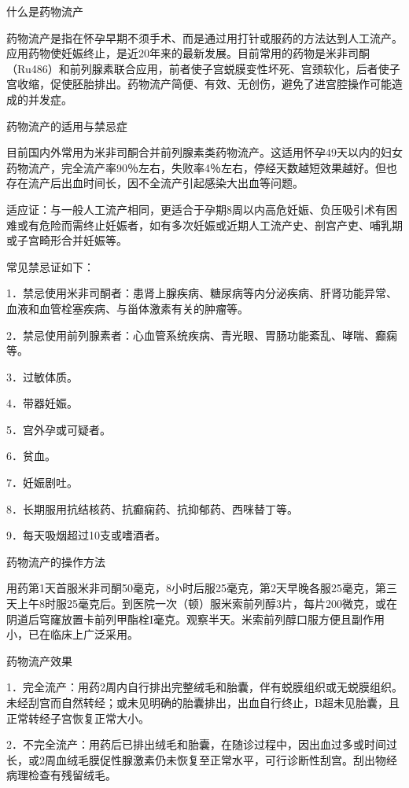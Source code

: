 \documentclass[12pt,UTF8,openany]{ctexbook}
\begin{document}
什么是药物流产


药物流产是指在怀孕早期不须手术、而是通过用打针或服药的方法达到人工流产。应用药物使妊娠终止，是近20年来的最新发展。目前常用的药物是米非司酮（Ru486）和前列腺素联合应用，前者使子宫蜕膜变性坏死、宫颈软化，后者使子宫收缩，促使胚胎排出。药物流产简便、有效、无创伤，避免了进宫腔操作可能造成的并发症。





药物流产的适用与禁忌症


目前国内外常用为米非司酮合并前列腺素类药物流产。这适用怀孕49天以内的妇女药物流产，完全流产率90％左右，失败率4％左右，停经天数越短效果越好。但也存在流产后出血时间长，因不全流产引起感染大出血等问题。

适应证：与一般人工流产相同，更适合于孕期8周以内高危妊娠、负压吸引术有困难或有危险而需终止妊娠者，如有多次妊娠或近期人工流产史、剖宫产吏、哺乳期或子宫畸形合并妊娠等。

常见禁忌证如下：

1．禁忌使用米非司酮者：患肾上腺疾病、糖尿病等内分泌疾病、肝肾功能异常、血液和血管栓塞疾病、与甾体激素有关的肿瘤等。

2．禁忌使用前列腺素者：心血管系统疾病、青光眼、胃肠功能紊乱、哮喘、癫痫等。

3．过敏体质。

4．带器妊娠。

5．宫外孕或可疑者。

6．贫血。

7．妊娠剧吐。

8．长期服用抗结核药、抗癫痫药、抗抑郁药、西咪替丁等。

9．每天吸烟超过10支或嗜酒者。





药物流产的操作方法


用药第1天首服米非司酮50毫克，8小时后服25毫克，第2天早晚各服25毫克，第三天上午8时服25毫克后。到医院一次（顿）服米索前列醇3片，每片200微克，或在阴道后穹窿放置卡前列甲酯栓I毫克。观察半天。米索前列醇口服方便且副作用小，已在临床上广泛采用。





药物流产效果


1．完全流产：用药2周内自行排出完整绒毛和胎囊，伴有蜕膜组织或无蜕膜组织。未经刮宫而自然转经；或未见明确的胎囊排出，出血自行终止，B超未见胎囊，且正常转经子宫恢复正常大小。

2．不完全流产：用药后已排出绒毛和胎囊，在随诊过程中，因出血过多或时间过长，或2周血绒毛膜促性腺激素仍未恢复至正常水平，可行诊断性刮宫。刮出物经病理检查有残留绒毛。
\end{document}
